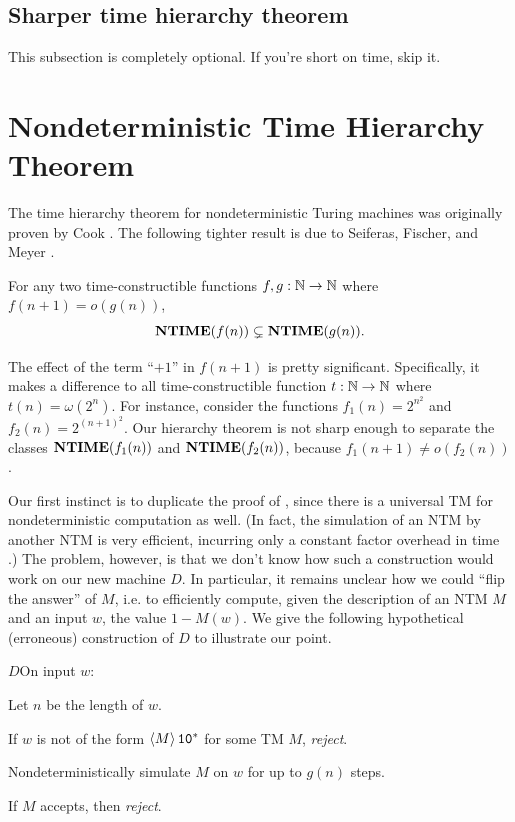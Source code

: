 \documentclass[11pt,twoside=off,numbers=noenddot]{scrbook}
\begin{document}
\subsection{Sharper time hierarchy theorem}

This subsection is completely optional. If you're short on time, skip it.

\section{Nondeterministic Time Hierarchy Theorem}
The time hierarchy theorem for nondeterministic Turing machines was originally proven by Cook \cite{cook1972hierarchy}. The following tighter result is due to Seiferas, Fischer, and Meyer \cite{seiferas1978separating}.

\begin{theorem}
  For any two time-constructible functions $f, g : \mathbb N \to \mathbb N$ where $f(n + 1) = o(g(n))$,
  \[ \textbf{NTIME}(f(n)) \subsetneq \textbf{NTIME}(g(n)). \]
\end{theorem}

\begin{remark}
  The effect of the term ``$+ 1$'' in $f(n + 1)$ is pretty significant. Specifically, it makes a difference to all time-constructible function $t : \mathbb N \to \mathbb N$ where $t(n) = \omega(2^n)$. For instance, consider the functions $f_1(n) = 2^{n^2}$ and $f_2(n) = 2^{(n + 1)^2}$. Our hierarchy theorem is not sharp enough to separate the classes $\textbf{NTIME}(f_1(n))$ and $\textbf{NTIME}(f_2(n))$, because $f_1(n + 1) \neq o(f_2(n))$.
\end{remark}

Our first instinct is to duplicate the proof of , since there is a universal TM for nondeterministic computation as well. (In fact, the simulation of an NTM by another NTM is very efficient, incurring only a constant factor overhead in time \cite{arora2009computational}.) The problem, however, is that we don't know how such a construction would work on our new machine $D$. In particular, it remains unclear how we could ``flip the answer'' of $M$, i.e. to efficiently compute, given the description of an NTM $M$ and an input $w$, the value $1 - M(w)$. We give the following hypothetical (erroneous) construction of $D$ to illustrate our point.

\begin{turing}{$D$}{On input $w$:}
\item Let $n$ be the length of $w$.
\item If $w$ is not of the form $\left< M \right>\texttt{1}\texttt{0}^\ast$ for some TM $M$, \emph{reject}.
\item Nondeterministically simulate $M$ on $w$ for up to $g(n)$ steps.
\item If $M$ accepts, then \emph{reject}. 
\end{turing}
\end{document}
